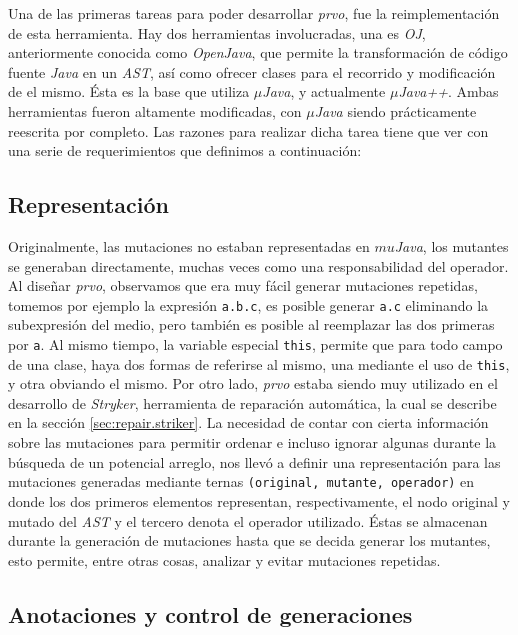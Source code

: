 Una de las primeras tareas para poder desarrollar \emph{prvo}, fue la reimplementaci\'on de esta herramienta. Hay dos herramientas involucradas, una es \emph{OJ}, anteriormente conocida como \emph{OpenJava}, que permite la transformaci\'on de c\'odigo fuente \emph{Java} en un \emph{AST}, as\'i como ofrecer clases para el recorrido y modificaci\'on de el mismo. \'Esta es la base que utiliza \emph{$\mu$Java}, y actualmente \emph{$\mu$Java++}. Ambas herramientas fueron altamente modificadas, con \emph{$\mu$Java} siendo pr\'acticamente reescrita por completo. Las razones para realizar dicha tarea tiene que ver con una serie de requerimientos que definimos a continuaci\'on:

\subsection{Representaci\'on}

Originalmente, las mutaciones no estaban representadas en \emph{$mu$Java}, los mutantes se generaban directamente, muchas veces como una responsabilidad del operador. Al dise\~nar \emph{prvo}, observamos que era muy f\'acil generar mutaciones repetidas, tomemos por ejemplo la expresi\'on \lstinline|a.b.c|, es posible generar \lstinline|a.c| eliminando la subexpresi\'on del medio, pero tambi\'en es posible al reemplazar las dos primeras por \lstinline|a|. Al mismo tiempo, la variable especial \lstinline|this|, permite que para todo campo de una clase, haya dos formas de referirse al mismo, una mediante el uso de \lstinline|this|, y otra obviando el mismo. Por otro lado, \emph{prvo} estaba siendo muy utilizado en el desarrollo de \emph{Stryker}, herramienta de reparaci\'on autom\'atica, la cual se describe en la secci\'on \ref{sec:repair.striker}. La necesidad de contar con cierta informaci\'on sobre las mutaciones para permitir ordenar e incluso ignorar algunas durante la b\'usqueda de un potencial arreglo, nos llev\'o a definir una representaci\'on para las mutaciones generadas mediante ternas \texttt{(original, mutante, operador)} en donde los dos primeros elementos representan, respectivamente, el nodo original y mutado del \emph{AST} y el tercero denota el operador utilizado. \'Estas se almacenan durante la generaci\'on de mutaciones hasta que se decida generar los mutantes, esto permite, entre otras cosas, analizar y evitar mutaciones repetidas.

\subsection{Anotaciones y control de generaciones}

